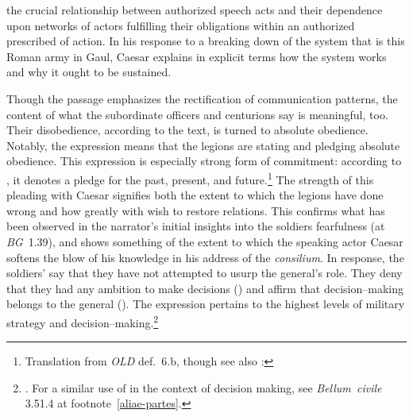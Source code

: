 \documentclass[12pt,letterpaper,oneside,final]{memoir}
\begin{document}
the crucial relationship between authorized speech acts and their dependence upon networks of actors fulfilling their obligations within an authorized prescribed of action. In his response to a breaking down of the system that is this Roman army in Gaul, Caesar explains in explicit terms how the system works and why it ought to be sustained.

Though the passage emphasizes the rectification of communication patterns, the content of what the subordinate officers and centurions say is meaningful, too. Their disobedience, according to the text, is turned to absolute obedience. Notably, the expression  means that the legions are stating and pledging absolute obedience. This expression is especially strong form of commitment: according to \textcite{kranerdittenbergermeusel1967}, it denotes a pledge for the past, present, and future.\footnote{Translation from \emph{OLD} def.~6.b, though see also \textcite{kranerdittenbergermeusel1967}: } The strength of this pleading with Caesar signifies both the extent to which the legions have done wrong and how greatly with wish to restore relations. This confirms what has been observed in the narrator's initial insights into the soldiers fearfulness (at \emph{BG}~1.39), and shows something of the extent to which the speaking actor Caesar softens the blow of his knowledge in his address of the \emph{consilium}. In response, the soldiers' say that they have not attempted to usurp the general's role. They deny that they had any ambition to make decisions () and affirm that decision--making belongs to the general (). The expression  pertains to the highest levels of military strategy and decision--making.\footnote{. For a similar use of  in the context of decision making, see \emph{Bellum~civile} 3.51.4 at footnote~\ref{aliae-partes}.}
\end{document}
